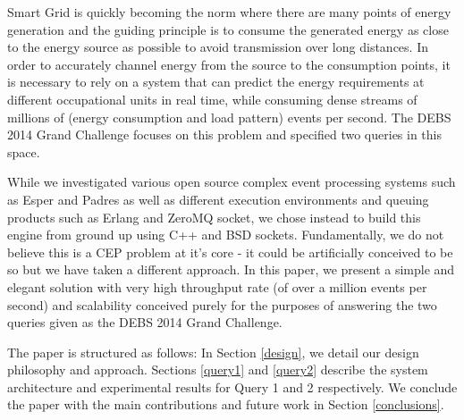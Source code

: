 Smart Grid is quickly becoming the norm where there are many points of energy generation and the guiding principle is to consume the generated energy as close to the energy source as possible to avoid transmission over long distances.
In order to accurately channel energy from the source to the consumption points, it is necessary to rely on a system that can predict the energy requirements at different occupational units in real time, while consuming dense streams of millions of (energy consumption and load pattern) events per second.
The DEBS 2014 Grand Challenge\cite{ziekow2014challenge} focuses on this problem and specified two queries in this space.

While we investigated various open source complex event processing systems such as Esper\cite{Esper} and Padres\cite{Padres} as well as different execution environments and queuing products such as Erlang\cite{erlang} and ZeroMQ \cite{zeromq} socket, we chose instead to build this engine from ground up using C++ and BSD sockets. Fundamentally, we do not believe this is a CEP problem at it's core - it could be artificially conceived to be so but we have taken a different approach. In this paper, we present a simple and elegant solution with very high throughput rate (of over a million events per second) and scalability conceived purely for the purposes of answering the two queries given as the DEBS 2014 Grand Challenge.

The paper is structured as follows: In Section \ref{design}, we detail our design philosophy and approach. Sections \ref{query1} and \ref{query2} describe the system architecture and experimental results for Query 1 and 2 respectively.
We conclude the paper with the main contributions and future work in Section \ref{conclusions}.

